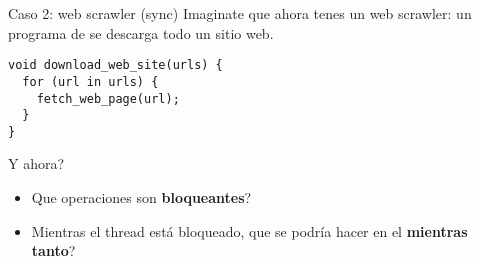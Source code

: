 \begin{frame}[fragile]{Caso 2: web scrawler (sync)}{}
Imaginate que ahora tenes un web scrawler: un programa de se descarga todo un sitio
web.
\begin{lstlisting}[style=normalnonumbers]
void download_web_site(urls) {
  for (url in urls) {
    fetch_web_page(url);
  }
}
\end{lstlisting}

Y ahora?

\begin{itemize}
    \item Que operaciones son \textbf{bloqueantes}?
    \item Mientras el thread est\'a bloqueado, que se podr\'ia hacer en el \textbf{mientras tanto}?
\end{itemize}
\end{frame}


